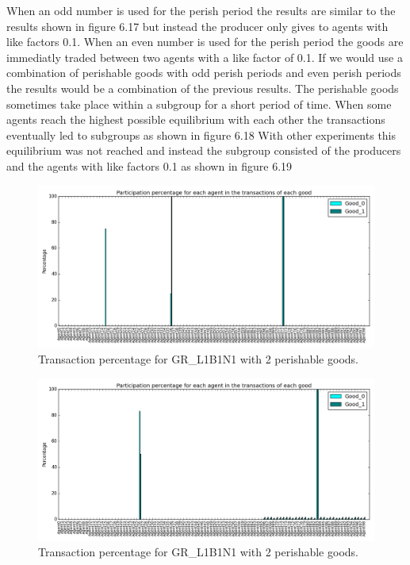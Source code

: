 \documentclass[twoside,openright]{uva-bachelor-thesis}
\begin{document}
\begin{description}
When an odd number is used for the perish period the results are similar to the results shown in figure 6.17 but instead the producer only gives to agents with like factors 0.1. When an even number is used for the perish period the goods are immediatly traded between two agents with a like factor of 0.1. If we would use a combination of perishable goods with odd perish periods and even perish periods the results would be a combination of the previous results. The perishable goods sometimes take place within a subgroup for a short period of time. When some agents reach the highest possible equilibrium with each other the transactions eventually led to subgroups as shown in figure 6.18 With other experiments this equilibrium was not reached and instead the subgroup consisted of the producers and the agents with like factors 0.1 as shown in figure 6.19 \\
\begin{figure}[h!]
  \centering
\includegraphics[scale=0.4]{Simulation_figures/GR_L1B1N1/2perishable_2233_100k}
  \caption{Transaction percentage for GR\_L1B1N1 with 2 perishable goods.}
\end{figure}
\begin{figure}[h!]
  \centering
    \includegraphics[scale=0.4]{Simulation_figures/GR_L1B1N1/2perishable_largercommunity}
  \caption{Transaction percentage for GR\_L1B1N1 with 2 perishable goods.}
\end{figure}


\end{description}
\end{document}
